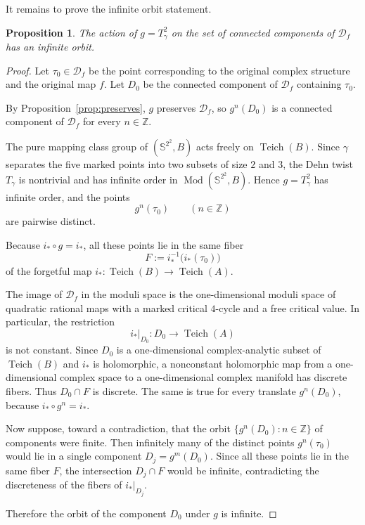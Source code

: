 \documentclass{article}
\newtheorem{proposition}{Proposition}
\DeclareMathOperator{\Teich}{Teich}
\DeclareMathOperator{\Mod}{Mod}
\newcommand{\Sph}{\mathbb{S}^2}
\newcommand{\Dcal}{\mathcal{D}}
\begin{document}
It remains to prove the infinite orbit statement.

\begin{proposition}
\label{prop:infinite}
The action of $g=T_\gamma^2$ on the set of connected components of
$\Dcal_f$ has an infinite orbit.
\end{proposition}

\begin{proof}
Let $\tau_0\in\Dcal_f$ be the point corresponding to the original complex
structure and the original map $f$. Let $D_0$ be the connected component
of $\Dcal_f$ containing $\tau_0$.

By Proposition~\ref{prop:preserves}, $g$ preserves $\Dcal_f$, so
$g^n(D_0)$ is a connected component of $\Dcal_f$ for every $n\in\mathbb Z$.

The pure mapping class group of $(\Sph^2,B)$ acts freely on
$\Teich(B)$. Since $\gamma$ separates the five marked points into two
subsets of size $2$ and $3$, the Dehn twist $T_\gamma$ is nontrivial and
has infinite order in $\Mod(\Sph^2,B)$. Hence $g=T_\gamma^2$ has infinite
order, and the points
\[
g^n(\tau_0)\qquad (n\in\mathbb Z)
\]
are pairwise distinct.

Because $i_*\circ g=i_*$, all these points lie in the same fiber
\[
F:=i_*^{-1}\bigl(i_*(\tau_0)\bigr)
\]
of the forgetful map $i_*:\Teich(B)\to \Teich(A)$.

The image of $\Dcal_f$ in the moduli space is the one-dimensional moduli
space of quadratic rational maps with a marked critical $4$-cycle and a
free critical value. In particular, the restriction
\[
i_*|_{D_0}:D_0\longrightarrow \Teich(A)
\]
is not constant. Since $D_0$ is a one-dimensional complex-analytic
subset of $\Teich(B)$ and $i_*$ is holomorphic, a nonconstant holomorphic
map from a one-dimensional complex space to a one-dimensional complex
manifold has discrete fibers. Thus $D_0\cap F$ is discrete. The same is
true for every translate $g^n(D_0)$, because
$i_*\circ g^n=i_*$.

Now suppose, toward a contradiction, that the orbit
$\{g^n(D_0):n\in\mathbb Z\}$ of components were finite. Then infinitely
many of the distinct points $g^n(\tau_0)$ would lie in a single component
$D_j=g^m(D_0)$. Since all these points lie in the same fiber $F$, the
intersection $D_j\cap F$ would be infinite, contradicting the discreteness
of the fibers of $i_*|_{D_j}$.

Therefore the orbit of the component $D_0$ under $g$ is infinite.
\end{proof}
\end{document}
